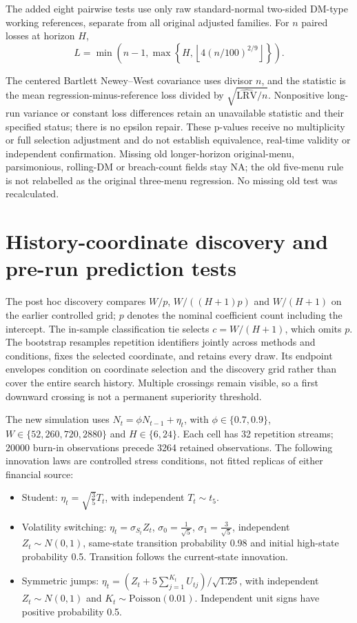 \documentclass[11pt,a4paper]{article}
\begin{document}
\begin{samepage}
The added eight pairwise tests use only raw standard-normal two-sided
DM-type working references, separate from all original adjusted families.
For \(n\) paired losses at horizon \(H\),
\[
L=\min\!\left(n-1,\max\!\left\{H,
\left\lfloor4(n/100)^{2/9}\right\rfloor\right\}\right).
\]
\end{samepage}
The centered Bartlett Newey--West covariance uses divisor \(n\), and the
statistic is the mean regression-minus-reference loss divided by
\(\sqrt{\widehat{\mathrm{LRV}}/n}\). Nonpositive long-run variance or constant
loss differences retain an unavailable statistic and their specified status;
there is no epsilon repair. These p-values receive no multiplicity or full
selection adjustment and do not establish equivalence, real-time validity or
independent confirmation. Missing old longer-horizon original-menu, parsimonious,
rolling-DM or breach-count fields stay NA; the old five-menu rule is not relabelled
as the original three-menu regression. No missing old test was recalculated.

\section{History-coordinate discovery and pre-run prediction tests}\label{sup:v9-history}

The post hoc discovery compares $W/p$, $W/((H+1)p)$ and $W/(H+1)$ on the earlier controlled grid; $p$ denotes the nominal coefficient count including the intercept. The in-sample classification tie selects $c=W/(H+1)$, which omits $p$. The bootstrap resamples repetition identifiers jointly across methods and conditions, fixes the selected coordinate, and retains every draw. Its endpoint envelopes condition on coordinate selection and the discovery grid rather than cover the entire search history. Multiple crossings remain visible, so a first downward crossing is not a permanent superiority threshold.

The new simulation uses $N_t=\phi N_{t-1}+\eta_t$, with $\phi\in\{0.7, 0.9\}$, $W\in\{52, 260, 720, 2880\}$ and $H\in\{6, 24\}$. Each cell has 32 repetition streams; 20000 burn-in observations precede 3264 retained observations. The following innovation laws are controlled stress conditions, not fitted replicas of either financial source:

\begin{itemize}
\item Student: $\eta_t=\sqrt{\frac{3}{5}}T_t$, with independent $T_t\sim t_{5}$.
\item Volatility switching: $\eta_t=\sigma_{S_t}Z_t$, $\sigma_0=\frac{1}{\sqrt{5}}$, $\sigma_1=\frac{3}{\sqrt{5}}$, independent $Z_t\sim N(0,1)$, same-state transition probability 0.98 and initial high-state probability 0.5. Transition follows the current-state innovation.
\item Symmetric jumps: $\eta_t=(Z_t+5\sum_{j=1}^{K_t}U_{tj})/\sqrt{1.25}$, with independent $Z_t\sim N(0,1)$ and $K_t\sim\mathrm{Poisson}(0.01)$. Independent unit signs have positive probability 0.5.
\end{itemize}
\end{document}
